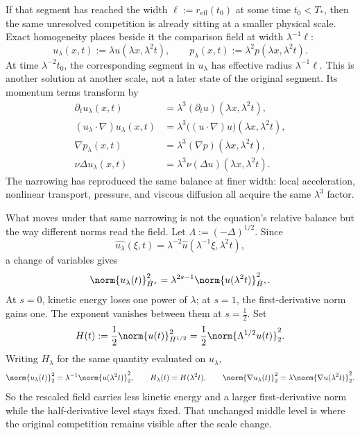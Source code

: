 
If that segment has reached the width \(\ell:=r_{\mathrm{eff}}(t_0)\) at some time \(t_0<T_*\), then the same unresolved competition is already sitting at a smaller physical scale. Exact \NavierStokes{} homogeneity places beside it the comparison field at width \(\lambda^{-1}\ell\):
\[
  u_\lambda(x,t)
  :=
  \lambda u(\lambda x,\lambda^2t),
  \qquad
  p_\lambda(x,t)
  :=
  \lambda^2p(\lambda x,\lambda^2t).
\]
At time \(\lambda^{-2}t_0\), the corresponding segment in \(u_\lambda\) has effective radius \(\lambda^{-1}\ell\). This is another solution at another scale, not a later state of the original segment. Its momentum terms transform by
\[
\begin{aligned}
  \partial_tu_\lambda(x,t)
  &=
  \lambda^3(\partial_tu)(\lambda x,\lambda^2t),
  \\
  (u_\lambda\cdot\nabla)u_\lambda(x,t)
  &=
  \lambda^3\bigl((u\cdot\nabla)u\bigr)(\lambda x,\lambda^2t),
  \\
  \nabla p_\lambda(x,t)
  &=
  \lambda^3(\nabla p)(\lambda x,\lambda^2t),
  \\
  \nu\Delta u_\lambda(x,t)
  &=
  \lambda^3\nu(\Delta u)(\lambda x,\lambda^2t).
\end{aligned}
\]
The narrowing has reproduced the same balance at finer width: local acceleration, nonlinear transport, pressure, and viscous diffusion all acquire the same \(\lambda^3\) factor.


What moves under that same narrowing is not the equation's relative balance but the way different norms read the field. Let \(\Lambda:=(-\Delta)^{1/2}\). Since
\[
  \widehat{u_\lambda}(\xi,t)
  =
  \lambda^{-2}\widehat u(\lambda^{-1}\xi,\lambda^2t),
\]
a change of variables gives
\[
  \norm{u_\lambda(t)}_{\dot H^s}^2
  =
  \lambda^{2s-1}
  \norm{u(\lambda^2t)}_{\dot H^s}^2.
\]
At \(s=0\), kinetic energy loses one power of \(\lambda\); at \(s=1\), the first-derivative norm gains one. The exponent vanishes between them at \(s=\tfrac12\). Set
\[
  H(t)
  :=
  \frac12\norm{u(t)}_{\dot H^{1/2}}^2
  =
  \frac12\norm{\Lambda^{1/2}u(t)}_2^2.
\]
Writing \(H_\lambda\) for the same quantity evaluated on \(u_\lambda\),
\[
  \norm{u_\lambda(t)}_2^2
  =
  \lambda^{-1}\norm{u(\lambda^2t)}_2^2,
  \qquad
  H_\lambda(t)=H(\lambda^2t),
  \qquad
  \norm{\nabla u_\lambda(t)}_2^2
  =
  \lambda\norm{\nabla u(\lambda^2t)}_2^2.
\]
So the rescaled field carries less kinetic energy and a larger first-derivative norm while the half-derivative level stays fixed. That unchanged middle level is where the original competition remains visible after the scale change.

